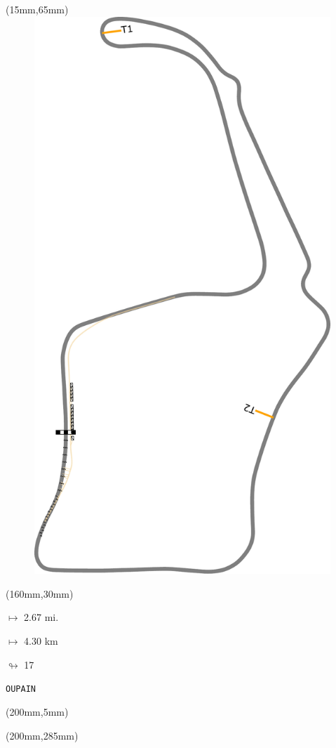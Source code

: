 \begin{textblock*}{185mm}(15mm,65mm)%
\centering
\mbox{\includegraphics[width=185mm,height=210mm,keepaspectratio]{PT/OUPAIN.pdf}}
\end{textblock*}
\begin{textblock*}{40mm}(160mm,30mm)%
\Large
\par$\mapsto$ 2.67 mi.
\par$\mapsto$ 4.30 km
\par$\looparrowright$ 17
\par\hfill\tiny\tt OUPAIN\\
\end{textblock*}
\begin{textblock*}{20mm}(200mm,5mm)%
\fbox{\thepage}
\label{OUPAIN}
\end{textblock*}
\begin{textblock*}{20mm}(200mm,285mm)%
\fbox{\thepage}
\end{textblock*}

